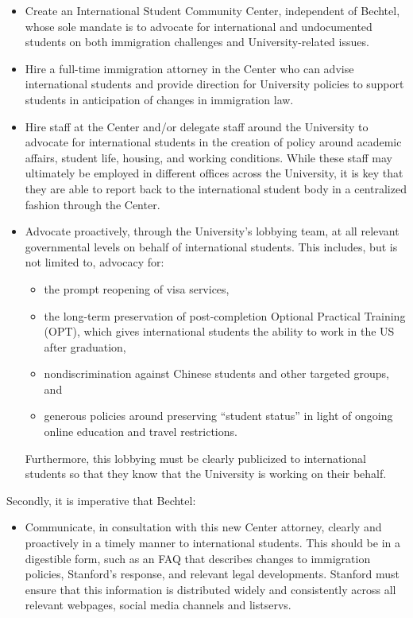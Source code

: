 \documentclass[12pt, titlepage, letterpaper]{article}
\begin{document}
\begin{itemize}
    \item Create an International Student Community Center, independent of Bechtel, whose sole mandate is to advocate for international and undocumented students on both immigration challenges and University-related issues. 
    \item Hire a full-time immigration attorney in the Center who can advise international students and provide direction for University policies to support students in anticipation of changes in immigration law.
    \item Hire staff at the Center and/or delegate staff around the University to advocate for international students in the creation of policy around academic affairs, student life, housing, and working conditions. While these staff may ultimately be employed in different offices across the University, it is key that they are able to report back to the international student body in a centralized fashion through the Center. 
    \item Advocate proactively, through the University’s lobbying team, at all relevant governmental levels on behalf of international students. This includes, but is not limited to, advocacy for: 
    
    \begin{itemize}
        \item the prompt reopening of visa services, 
        \item the long-term preservation of post-completion Optional Practical Training (OPT), which gives international students the ability to work in the US after graduation, 
        \item nondiscrimination against Chinese students and other targeted groups, and
        \item generous policies around preserving “student status” in light of ongoing online education and travel restrictions. 
    \end{itemize}
    
    Furthermore, this lobbying must be clearly publicized to international students so that they know that the University is working on their behalf.

\end{itemize}

\newpage
Secondly, it is imperative that Bechtel:
\begin{itemize}
    \item Communicate, in consultation with this new Center attorney, clearly and proactively in a timely manner to international students. This should be in a digestible form, such as an FAQ that describes changes to immigration policies, Stanford’s response, and relevant legal developments. Stanford must ensure that this information is distributed widely and consistently across all relevant webpages, social media channels and listservs. 
\end{itemize}
\end{document}
